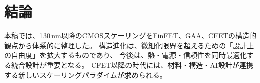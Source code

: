 \section{結論}
本稿では、130\,nm以降のCMOSスケーリングをFinFET、GAA、CFETの構造的観点から体系的に整理した。  
構造進化は、微細化限界を超えるための「設計上の自由度」を拡大するものであり、  
今後は、熱・電源・信頼性を同時最適化する統合設計が重要となる。  
CFET以降の時代には、材料・構造・AI設計が連携する新しいスケーリングパラダイムが求められる。
